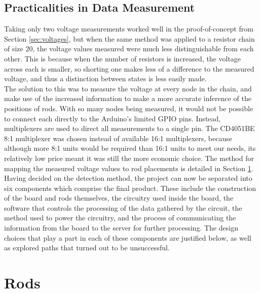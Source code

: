 
\subsection{Practicalities in Data Measurement}
Taking only two voltage measurements worked well in the proof-of-concept from Section \ref{sec:voltages}, but when the same method was applied to a resistor chain of size 20, the voltage values measured were much less distinguishable from each other. This is because when the number of resistors is increased, the voltage across each is smaller, so shorting one makes less of a difference to the measured voltage, and thus a distinction between states is less easily made. \\

The solution to this was to measure the voltage at every node in the chain, and make use of the increased information to make a more accurate inference of the positions of rods. With so many nodes being measured, it would not be possible to connect each directly to the Arduino's limited GPIO pins. Instead, multiplexers are used to direct all measurements to a single pin. The CD4051BE 8:1 multiplexer \cite{CD4051BE27:online} was chosen instead of available 16:1 multiplexers, because although more 8:1 units would be required than 16:1 units to meet our needs, its relatively low price meant it was still the more economic choice. The method for mapping the measured voltage values to rod placements is detailed in Section \ref{sec:rods}. \\


Having decided on the detection method, the project can now be separated into six components which comprise the final product. These include the construction of the board and rods themselves, the circuitry used inside the board, the software that controls the processing of the data gathered by the circuit, the method used to power the circuitry, and the process of communicating the information from the board to the server for further processing. The design choices that play a part in each of these components are justified below, as well as explored paths that turned out to be unsuccessful. 

\section{Rods}
\label{sec:rods}

